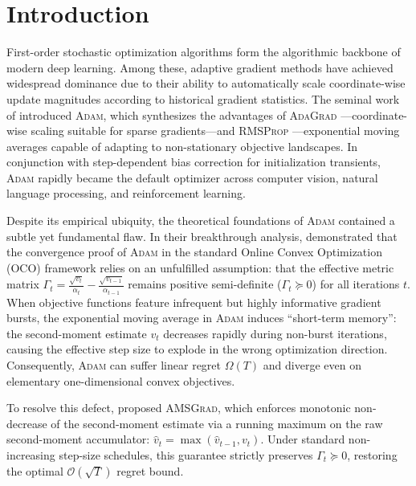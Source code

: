 \section{Introduction}
\label{sec:intro}

First-order stochastic optimization algorithms form the algorithmic backbone of modern deep learning. Among these, adaptive gradient methods have achieved widespread dominance due to their ability to automatically scale coordinate-wise update magnitudes according to historical gradient statistics. The seminal work of \citet{kingma2014adam} introduced \textsc{Adam}, which synthesizes the advantages of \textsc{AdaGrad} \citep{duchi2011adaptive}---coordinate-wise scaling suitable for sparse gradients---and \textsc{RMSProp} \citep{tieleman2012rmsprop}---exponential moving averages capable of adapting to non-stationary objective landscapes. In conjunction with step-dependent bias correction for initialization transients, \textsc{Adam} rapidly became the default optimizer across computer vision, natural language processing, and reinforcement learning.

Despite its empirical ubiquity, the theoretical foundations of \textsc{Adam} contained a subtle yet fundamental flaw. In their breakthrough analysis, \citet{reddi2018convergence} demonstrated that the convergence proof of \textsc{Adam} in the standard Online Convex Optimization (OCO) framework \citep{hazan2016introduction} relies on an unfulfilled assumption: that the effective metric matrix $\Gamma_t = \frac{\sqrt{v_t}}{\alpha_t} - \frac{\sqrt{v_{t-1}}}{\alpha_{t-1}}$ remains positive semi-definite ($\Gamma_t \succeq 0$) for all iterations $t$. When objective functions feature infrequent but highly informative gradient bursts, the exponential moving average in \textsc{Adam} induces ``short-term memory'': the second-moment estimate $v_t$ decreases rapidly during non-burst iterations, causing the effective step size to explode in the wrong optimization direction. Consequently, \textsc{Adam} can suffer linear regret $\Omega(T)$ and diverge even on elementary one-dimensional convex objectives.

To resolve this defect, \citet{reddi2018convergence} proposed \textsc{AMSGrad}, which enforces monotonic non-decrease of the second-moment estimate via a running maximum on the raw second-moment accumulator: $\hat{v}_t = \max(\hat{v}_{t-1}, v_t)$. Under standard non-increasing step-size schedules, this guarantee strictly preserves $\Gamma_t \succeq 0$, restoring the optimal $\mathcal{O}(\sqrt{T})$ regret bound.


